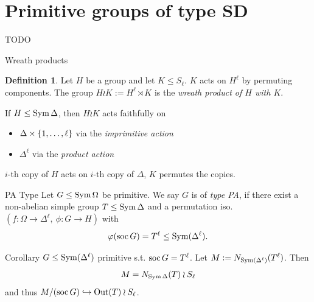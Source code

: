 \documentclass{beamer}
\theoremstyle{plain}
\theoremstyle{definition}
\newtheorem{defn}[thm]{Definition}
\begin{document}

\section{Primitive groups of type SD}
\begin{frame}{TODO}

\end{frame}

\begin{frame}{Wreath products}
\begin{defn}
    Let $H$ be a group and let $K \leq S_\ell$.
    $K$ acts on $H ^ \ell$ by permuting components.
    The group
    $H \wr K := H ^ \ell \rtimes K$
    is the \emph{wreath product of $H$ with $K$}.
\end{defn}

\pause
If $H \leq \operatorname{Sym} \Delta$, then $H \wr K$ acts faithfully on
\begin{itemize}
\item $\Delta \times  \left\{ 1, \ldots, \ell \right\} $ via the \emph{imprimitive action}
\item $\Delta ^ \ell$ via the \emph{product action}
\end{itemize}

$i$-th copy of $H$ acts on $i$-th copy of $\Delta$, $K$ permutes the copies.
\end{frame}


%

\begin{frame}{PA Type}
Let $G \leq \operatorname{Sym} \Omega$ be primitive.
We say $G$ is of \emph{type PA}, if
there exist a non-abelian simple group
$T \leq \operatorname{Sym} \Delta$
and a permutation iso.
$(f : \Omega \to \Delta ^ \ell,~ \phi : G \to H)$
with
\[
\varphi (\operatorname{soc} G) = T ^ \ell \leq \operatorname{Sym}(\Delta ^ \ell).
\]

\pause
\begin{block}{Corollary}
$G \leq \operatorname{Sym}(\Delta ^ \ell)$ primitive s.t.
$\operatorname{soc} G = T ^ \ell$.
Let $M := N_{\operatorname{Sym} (\Delta ^ \ell)}(T ^ \ell)$.
Then
\[
    M = N_{\operatorname{Sym} \Delta}(T) \wr S_\ell
\]
and thus $M / (\operatorname{soc} G) \hookrightarrow \operatorname{Out}(T) \wr S_\ell$.
\end{block}
\end{frame}
\end{document}
